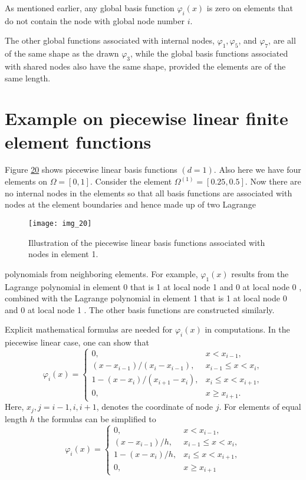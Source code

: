 \documentclass[../main.tex]{subfiles}
\begin{document}
\noindent As mentioned earlier, any global basis function $\varphi_{i}(x)$ is zero on elements that do not contain the node with global node number $i$.

The other global functions associated with internal nodes, $\varphi_{1}, \varphi_{5}$, and $\varphi_{7}$, are all of the same shape as the drawn $\varphi_{3}$, while the global basis functions associated with shared nodes also have the same shape, provided the elements are of the same length.

\section[Example on piecewise linear finite element functions]{Example on piecewise linear finite element functions}
\label{sec:sec_3_4}
Figure \hyperref[fig:img_20]{20} shows piecewise linear basis functions $(d=1)$. Also here we have four elements on $\Omega=[0,1]$. Consider the element $\Omega^{(1)}=[0.25,0.5]$. Now there are no internal nodes in the elements so that all basis functions are associated with nodes at the element boundaries and hence made up of two Lagrange
\begin{figure}[H]
	\centering
	\texttt{[image: img\_20]}
	\caption{Illustration of the piecewise linear basis functions associated with
		nodes in element 1.}
	\label{fig:img_20}
\end{figure}

\noindent polynomials from neighboring elements. For example, $\varphi_{1}(x)$ results from the Lagrange polynomial in element 0 that is 1 at local node 1 and 0 at local node 0 , combined with the Lagrange polynomial in element 1 that is 1 at local node 0 and 0 at local node 1 . The other basis functions are constructed similarly.

Explicit mathematical formulas are needed for $\varphi_{i}(x)$ in computations. In the piecewise linear case, one can show that
\begin{equation}\label{eqa53}
	\varphi_{i}(x)= \begin{cases}0, & x<x_{i-1}, \\ \left(x-x_{i-1}\right) /\left(x_{i}-x_{i-1}\right), & x_{i-1} \leq x<x_{i}, \\ 1-\left(x-x_{i}\right) /\left(x_{i+1}-x_{i}\right), & x_{i} \leq x<x_{i+1}, \\ 0, & x \geq x_{i+1}.\end{cases}
\end{equation}
Here, $x_{j}, j=i-1, i, i+1$, denotes the coordinate of node $j$. For elements of equal length $h$ the formulas can be simplified to
\begin{equation}\label{eqa54}
	\varphi_{i}(x)= \begin{cases}0, & x<x_{i-1}, \\ \left(x-x_{i-1}\right) / h, & x_{i-1} \leq x<x_{i}, \\ 1-\left(x-x_{i}\right) / h, & x_{i} \leq x<x_{i+1}, \\ 0, & x \geq x_{i+1}\end{cases}
\end{equation}
\end{document}
